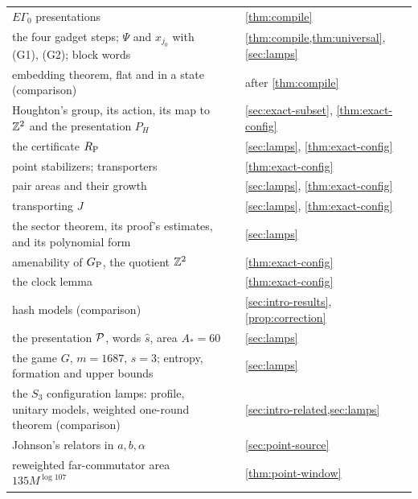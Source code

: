 {\begin{longtable}{@{}L{0.45\textwidth}L{0.21\textwidth}L{0.26\textwidth}@{}}
\midrule
$E\Gamma_0$ presentations & \cite[Def.~10.1]{DM-game} & \cref{thm:compile}\\
the four gadget steps; $\Psi$ and $x_{j_0}$ with (G1), (G2); block words & \cite[Lemma~B.1, Table~3]{DM-game} &
\cref{thm:compile,thm:universal}, \cref{sec:lamps}\\
embedding theorem, flat and in a state (comparison) & \cite[Thm.~B.3]{DM-game} & after \cref{thm:compile}\\
\midrule
Houghton's group, its action, its map to $\mathbb Z^2$ and the presentation $P_H$ & \cite[Def.~6.1, (5), (6), App.~A]{DM-game} &
\cref{sec:exact-subset}, \cref{thm:exact-config}\\
the certificate $R_{\mathrm P}$ & \cite[Def.~7.1, Table~2]{DM-game} & \cref{sec:lamps}, \cref{thm:exact-config}\\
point stabilizers; transporters & \cite[Lemma~7.4, Def.~7.5]{DM-game} & \cref{thm:exact-config}\\
pair areas and their growth & \cite[Thm.~7.8, Rem.~7.10]{DM-game} & \cref{sec:lamps}, \cref{thm:exact-config}\\
transporting $J$ & \cite[Lemma~7.11]{DM-game} & \cref{sec:lamps}, \cref{thm:exact-config}\\
the sector theorem, its proof's estimates, and its polynomial form & \cite[Thm.~8.1, Rem.~8.3]{DM-game} & \cref{sec:lamps}\\
amenability of $G_{\mathrm P}$, the quotient $\mathbb Z^2$ & \cite[Prop.~6.8]{DM-game} & \cref{thm:exact-config}\\
the clock lemma & \cite[Lemma~9.3]{DM-game} & \cref{thm:exact-config}\\
hash models (comparison) & \cite[Prop.~9.4]{DM-game} & \cref{sec:intro-results}, \cref{prop:correction}\\
the presentation $\mathcal P$, words $\hat s$, area $A_*=60$ & \cite[Prop.~10.3]{DM-game} & \cref{sec:lamps}\\
the game $G$, $m=1687$, $s=3$; entropy, formation and upper bounds & \cite[Thm.~A, Thm.~10.5, Cor.~10.6]{DM-game} &
\cref{sec:lamps}\\
\midrule
the $S_3$ configuration lamps: profile, unitary models, weighted one-round theorem (comparison) & \cite[Thm.~A, Thm.~10.1]{DM-lamps} &
\cref{sec:intro-related,sec:lamps}\\
\midrule
Johnson's relators in $a,b,\alpha$ & \cite[(1)]{DM-H3} & \cref{sec:point-source}\\
reweighted far-commutator area $135M^{\log107}$ & \cite[Thm.~3.2]{DM-H3} & \cref{thm:point-window}\\

\end{longtable}}
